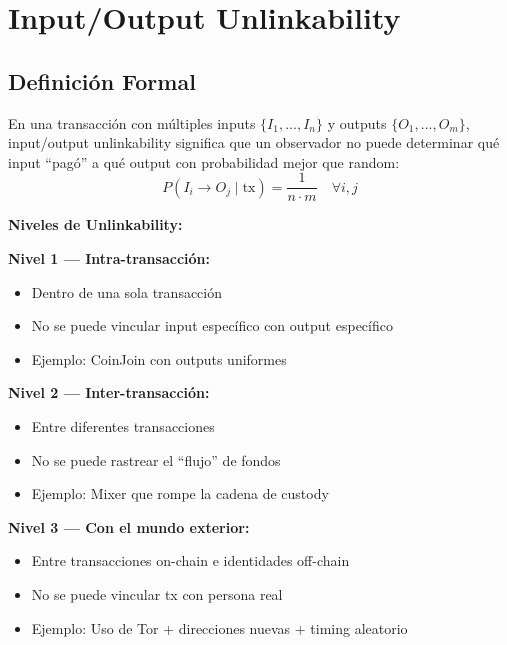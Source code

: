 \documentclass[11pt,a4paper,twoside]{book}
\begin{document}
\section{Input/Output Unlinkability}
\label{sec:io-unlinkability}

\subsection{Definici\'on Formal}

\begin{definition}
En una transacci\'on con m\'ultiples inputs $\{I_1, ..., I_n\}$ y outputs $\{O_1, ..., O_m\}$, input/output unlinkability significa que un observador no puede determinar qu\'e input ``pag\'o'' a qu\'e output con probabilidad mejor que random:
\[
P(I_i \to O_j \mid \text{tx}) = \frac{1}{n \cdot m} \quad \forall i, j
\]
\end{definition}

\begin{mathnote}
\textbf{Niveles de Unlinkability:}

\textbf{Nivel 1 --- Intra-transacci\'on:}
\begin{itemize}
    \item Dentro de una sola transacci\'on
    \item No se puede vincular input espec\'ifico con output espec\'ifico
    \item Ejemplo: CoinJoin con outputs uniformes
\end{itemize}

\textbf{Nivel 2 --- Inter-transacci\'on:}
\begin{itemize}
    \item Entre diferentes transacciones
    \item No se puede rastrear el ``flujo'' de fondos
    \item Ejemplo: Mixer que rompe la cadena de custody
\end{itemize}

\textbf{Nivel 3 --- Con el mundo exterior:}
\begin{itemize}
    \item Entre transacciones on-chain e identidades off-chain
    \item No se puede vincular tx con persona real
    \item Ejemplo: Uso de Tor + direcciones nuevas + timing aleatorio
\end{itemize}
\end{mathnote}
\end{document}
